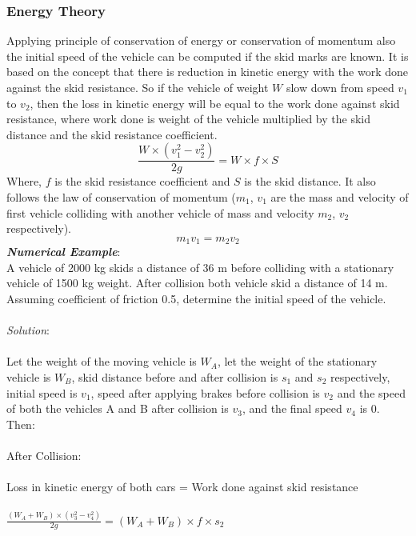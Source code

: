 \subsubsection{Energy Theory}
Applying principle of conservation of energy or conservation of momentum also the initial speed of the vehicle can be computed if the skid marks are known. It is based on the concept that there is reduction in kinetic energy with the work done against the skid resistance. So if the vehicle of weight $ W $ slow down from speed $ v_1 $ to $ v_2 $, then the loss in kinetic energy will be equal to the work done against skid resistance, where work done is weight of the vehicle multiplied by the skid distance and the skid resistance coefficient.
\begin{equation}
	\frac{W \times (v_1^2 - v_2^2)}{2g} = W \times f \times S
\end{equation}
Where, $ f $ is the skid resistance coefficient and $ S $ is the skid distance. It also follows the law of conservation of momentum ($ m_1 $, $ v_1 $ are the mass and velocity of first vehicle colliding with another vehicle of mass and velocity $ m_2 $, $ v_2 $ respectively).
\begin{equation}
	 m_1 v_1 = m_2 v_2
\end{equation}
\textbf{\textit{Numerical Example}}:\\
A vehicle of 2000 kg skids a distance of 36 m before colliding with a stationary vehicle of 1500 kg weight. After collision both vehicle skid a distance of 14 m. Assuming coefficient of friction 0.5, determine the initial speed of the vehicle.\\\\
\textit{Solution}:\\\\
Let the weight of the moving vehicle is $ W_A $, let the weight of the stationary vehicle is $ W_B $, skid distance before and after collision is $ s_1 $ and $ s_2 $ respectively, initial speed is $ v_1 $, speed after applying brakes before collision is $ v_2 $ and the speed of both the vehicles A and B after collision is $ v_3 $, and the final speed $ v_4 $ is 0. Then:\\\\
After Collision:\\\\
Loss in kinetic energy of both cars = Work done against skid resistance\\\\
$ \frac{(W_A + W_B) \times (v_3^2 - v_4^2)}{2g} = (W_A + W_B) \times f \times s_2 $\\\\
